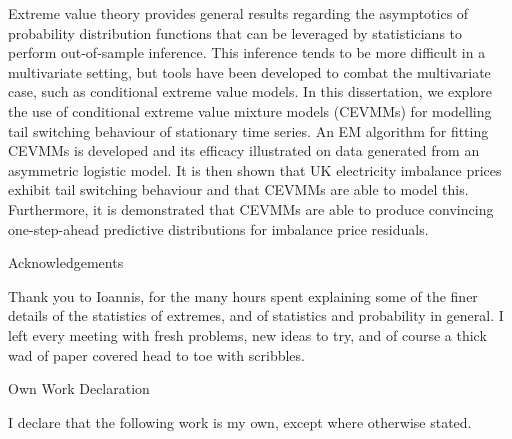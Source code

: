 \documentclass[11pt,twoside,openany]{book}
\numberwithin{Theorem}{chapter}
\numberwithin{Definition}{chapter}
\numberwithin{Lemma}{chapter}
\numberwithin{Algorithm}{chapter}
\numberwithin{equation}{chapter}
\begin{document}
Extreme value theory provides general results regarding the asymptotics of
probability distribution functions that can be leveraged by statisticians to
perform out-of-sample inference. This inference tends to be more difficult in a
multivariate setting, but tools have been developed to combat the multivariate
case, such as conditional extreme value models. In this dissertation, we explore
the use of conditional extreme value mixture models (CEVMMs) for modelling
tail switching behaviour of stationary time series.
An EM algorithm for fitting  CEVMMs is developed and its efficacy
illustrated on data generated from an asymmetric logistic model.
It is then shown that UK electricity imbalance prices exhibit tail switching
behaviour and that CEVMMs are able to model this. Furthermore,
it is demonstrated that CEVMMs are able to produce convincing one-step-ahead
predictive distributions for imbalance price residuals.




\clearpage

\begin{center}
\Large{Acknowledgements}
\end{center}

Thank you to Ioannis, for the many hours spent explaining some of the finer
details of the statistics of extremes, and of statistics and probability in
general. I left every meeting with fresh problems, new ideas to try, and of course a
thick wad of paper covered head to toe with scribbles.

\clearpage

\begin{center}
\Large{Own Work Declaration}
\end{center}

I declare that the following work is my own, except where otherwise stated.



\clearpage



\pagestyle{memo}
\end{document}
